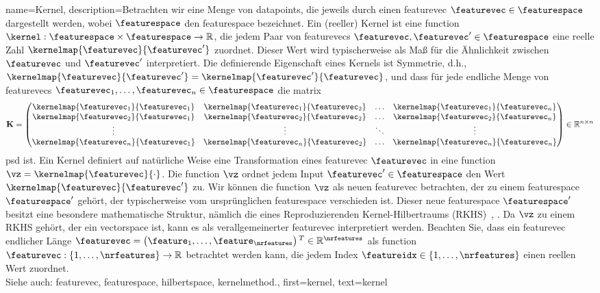 {{{{
{name={Kernel}, 
	description={Betrachten wir eine Menge von \glspl{datapoint}, die jeweils durch einen \gls{featurevec} 
	 	$\featurevec \in \featurespace$ dargestellt werden, wobei $\featurespace$ den \gls{featurespace} bezeichnet. 
	 	Ein (reeller) Kernel ist eine \gls{function} 
	 	$\kernel: \featurespace \times \featurespace \rightarrow \mathbb{R}$, die jedem Paar von 
     		\glspl{featurevec} $\featurevec, \featurevec' \in \featurespace$ eine reelle Zahl $\kernelmap{\featurevec}{\featurevec'}$ zuordnet. 
     		Dieser Wert wird typischerweise als Maß für die Ähnlichkeit zwischen $\featurevec$ und $\featurevec'$ interpretiert. 
	 	Die definierende Eigenschaft eines Kernels ist Symmetrie, d.h.,
	 	$\kernelmap{\featurevec}{\featurevec'} = \kernelmap{\featurevec'}{\featurevec}$, und dass 
	 	für jede endliche Menge von \glspl{featurevec} $\featurevec_1, \ldots, \featurevec_n \in \featurespace$ die \gls{matrix} 
	  	\begin{equation}
	 		\nonumber
	 		\mathbf{K} = \begin{pmatrix}
	 			\kernelmap{\featurevec_1}{\featurevec_1} & \kernelmap{\featurevec_1}{\featurevec_2} & \ldots & \kernelmap{\featurevec_1}{\featurevec_n} \\
	 			\kernelmap{\featurevec_2}{\featurevec_1} & \kernelmap{\featurevec_2}{\featurevec_2} & \ldots & \kernelmap{\featurevec_2}{\featurevec_n} \\
	 			\vdots											
	 			& \vdots & \ddots & \vdots \\
	 			\kernelmap{\featurevec_n}{\featurevec_1} & \kernelmap{\featurevec_n}{\featurevec_2} & \ldots & \kernelmap{\featurevec_n}{\featurevec_n} 
	 		\end{pmatrix} \in \mathbb{R}^{n \times n}
	 	\end{equation}
	 	\gls{psd} ist. 
     		Ein Kernel definiert auf natürliche Weise eine Transformation eines \gls{featurevec} $\featurevec$ in eine 
	 	\gls{function} $\vz = \kernelmap{\featurevec}{\cdot}$. Die \gls{function} $\vz$ ordnet jedem Input $\featurevec' \in \featurespace$ den Wert $\kernelmap{\featurevec}{\featurevec'}$ zu. 
	 	Wir können die \gls{function} $\vz$ als neuen \gls{featurevec} betrachten, der zu einem 
	 	\gls{featurespace} $\featurespace'$ gehört, der typischerweise vom ursprünglichen \gls{featurespace} verschieden ist. 
	 	Dieser neue \gls{featurespace} $\featurespace'$ besitzt eine besondere mathematische Struktur, nämlich die eines 
	 	Reproduzierenden Kernel-Hilbertraums (RKHS)~\cite{LearningKernelsBook}, \cite{LampertNowKernel}.
     		Da $\vz$ zu einem RKHS gehört, der ein \gls{vectorspace} ist, kann es als verallgemeinerter \gls{featurevec} interpretiert werden. Beachten Sie, dass ein \gls{featurevec} endlicher Länge $\featurevec=\big(\feature_{1}, \ldots, \feature_{\nrfeatures} \big)\,^{T} \in \mathbb{R}^{\nrfeatures}$ 
	 	als \gls{function} $\featurevec: \{1, \ldots, \nrfeatures\} \rightarrow \mathbb{R}$ betrachtet werden kann, 
	 	die jedem Index $\featureidx \in \{1, \ldots, \nrfeatures\}$ einen reellen Wert zuordnet.
          		\\
		Siehe auch: \gls{featurevec}, \gls{featurespace}, \gls{hilbertspace}, \gls{kernelmethod}.},
	first={kernel},
	text={kernel} 
}

}}}}
